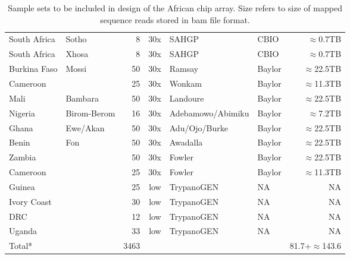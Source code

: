 \begin{table}[ht]
\begin{tabular}{llrrllr}
South Africa & Sotho & 8 & 30x & SAHGP & CBIO & $\approx$0.7TB \\
South Africa & Xhosa & 8 & 30x & SAHGP & CBIO & $\approx$0.7TB \\

Burkina Faso & Mossi & 50 & 30x & Ramsay & Baylor & $\approx$22.5TB \\
Cameroon & & 25 & 30x & Wonkam & Baylor & $\approx$11.3TB \\
Mali & Bambara & 50 & 30x & Landoure & Baylor & $\approx$22.5TB \\
Nigeria & Birom-Berom & 16 & 30x & Adebamowo/Abimiku & Baylor & $\approx$7.2TB \\
Ghana & Ewe/Akan & 50 & 30x & Adu/Ojo/Burke & Baylor & $\approx$22.5TB \\
Benin & Fon & 50 & 30x & Awadalla & Baylor & $\approx$22.5TB \\
Zambia & & 50 & 30x & Fowler & Baylor & $\approx$22.5TB \\
Cameroon & & 25 & 30x & Fowler & Baylor & $\approx$11.3TB \\
Guinea & & 25 & low & TrypanoGEN & NA & NA \\
Ivory Coast & & 30 & low & TrypanoGEN & NA & NA \\
DRC & & 12 & low & TrypanoGEN & NA & NA \\
Uganda & & 33 & low & TrypanoGEN & NA & NA \\
\hline
Total* &  & 3463 &  &  & & 81.7+$\approx$143.6
\end{tabular}
\caption{Sample sets to be included in design of the African chip array. Size refers to size of mapped sequence reads stored in bam file format.}
\label{tab:samples}
\end{table}